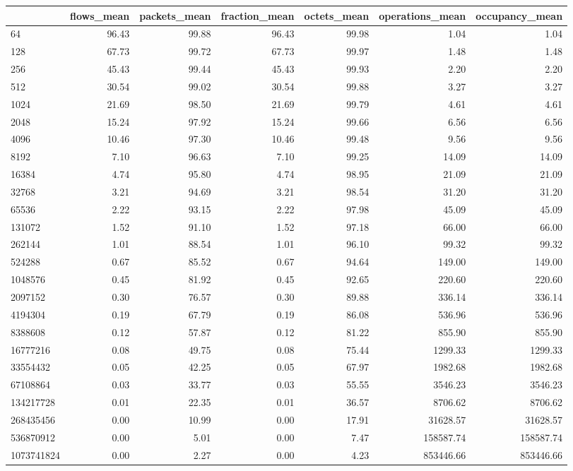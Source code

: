 \begin{tabular}{lrrrrrr}
\toprule
 & flows_mean & packets_mean & fraction_mean & octets_mean & operations_mean & occupancy_mean \\
\midrule
64 & 96.43 & 99.88 & 96.43 & 99.98 & 1.04 & 1.04 \\
128 & 67.73 & 99.72 & 67.73 & 99.97 & 1.48 & 1.48 \\
256 & 45.43 & 99.44 & 45.43 & 99.93 & 2.20 & 2.20 \\
512 & 30.54 & 99.02 & 30.54 & 99.88 & 3.27 & 3.27 \\
1024 & 21.69 & 98.50 & 21.69 & 99.79 & 4.61 & 4.61 \\
2048 & 15.24 & 97.92 & 15.24 & 99.66 & 6.56 & 6.56 \\
4096 & 10.46 & 97.30 & 10.46 & 99.48 & 9.56 & 9.56 \\
8192 & 7.10 & 96.63 & 7.10 & 99.25 & 14.09 & 14.09 \\
16384 & 4.74 & 95.80 & 4.74 & 98.95 & 21.09 & 21.09 \\
32768 & 3.21 & 94.69 & 3.21 & 98.54 & 31.20 & 31.20 \\
65536 & 2.22 & 93.15 & 2.22 & 97.98 & 45.09 & 45.09 \\
131072 & 1.52 & 91.10 & 1.52 & 97.18 & 66.00 & 66.00 \\
262144 & 1.01 & 88.54 & 1.01 & 96.10 & 99.32 & 99.32 \\
524288 & 0.67 & 85.52 & 0.67 & 94.64 & 149.00 & 149.00 \\
1048576 & 0.45 & 81.92 & 0.45 & 92.65 & 220.60 & 220.60 \\
2097152 & 0.30 & 76.57 & 0.30 & 89.88 & 336.14 & 336.14 \\
4194304 & 0.19 & 67.79 & 0.19 & 86.08 & 536.96 & 536.96 \\
8388608 & 0.12 & 57.87 & 0.12 & 81.22 & 855.90 & 855.90 \\
16777216 & 0.08 & 49.75 & 0.08 & 75.44 & 1299.33 & 1299.33 \\
33554432 & 0.05 & 42.25 & 0.05 & 67.97 & 1982.68 & 1982.68 \\
67108864 & 0.03 & 33.77 & 0.03 & 55.55 & 3546.23 & 3546.23 \\
134217728 & 0.01 & 22.35 & 0.01 & 36.57 & 8706.62 & 8706.62 \\
268435456 & 0.00 & 10.99 & 0.00 & 17.91 & 31628.57 & 31628.57 \\
536870912 & 0.00 & 5.01 & 0.00 & 7.47 & 158587.74 & 158587.74 \\
1073741824 & 0.00 & 2.27 & 0.00 & 4.23 & 853446.66 & 853446.66 \\
\bottomrule
\end{tabular}
